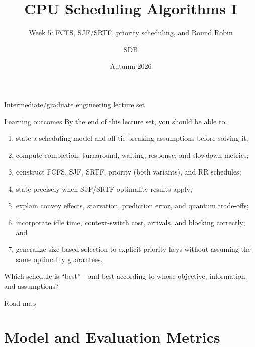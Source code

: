 \documentclass[aspectratio=169,11pt]{beamer}
\title[CPU Scheduling I]{CPU Scheduling Algorithms I}
\subtitle{Week 5: FCFS, SJF/SRTF, priority scheduling, and Round Robin}
\author[SDB]{SDB}
\date{Autumn 2026}
\begin{document}
\begin{frame}
  \titlepage
  \vspace{-1.2em}
  \begin{center}
    \small Intermediate/graduate engineering lecture set
  \end{center}
\end{frame}

\begin{frame}{Learning outcomes}
  By the end of this lecture set, you should be able to:
  \begin{enumerate}
    \item state a scheduling model and all tie-breaking assumptions before solving it;
    \item compute completion, turnaround, waiting, response, and slowdown metrics;
    \item construct FCFS, SJF, SRTF, priority (both variants), and RR schedules;
    \item state precisely when SJF/SRTF optimality results apply;
    \item explain convoy effects, starvation, prediction error, and quantum trade-offs;
    \item incorporate idle time, context-switch cost, arrivals, and blocking correctly; and
    \item generalize size-based selection to explicit priority keys without assuming the same optimality guarantees.
  \end{enumerate}
  \begin{tcolorbox}[title=Guiding question,colback=osorange!5,colframe=osorange!70]
    Which schedule is ``best''---and best according to whose objective, information, and assumptions?
  \end{tcolorbox}
\end{frame}

\begin{frame}{Road map}
  \tableofcontents
\end{frame}

\section{Model and Evaluation Metrics}
\end{document}

